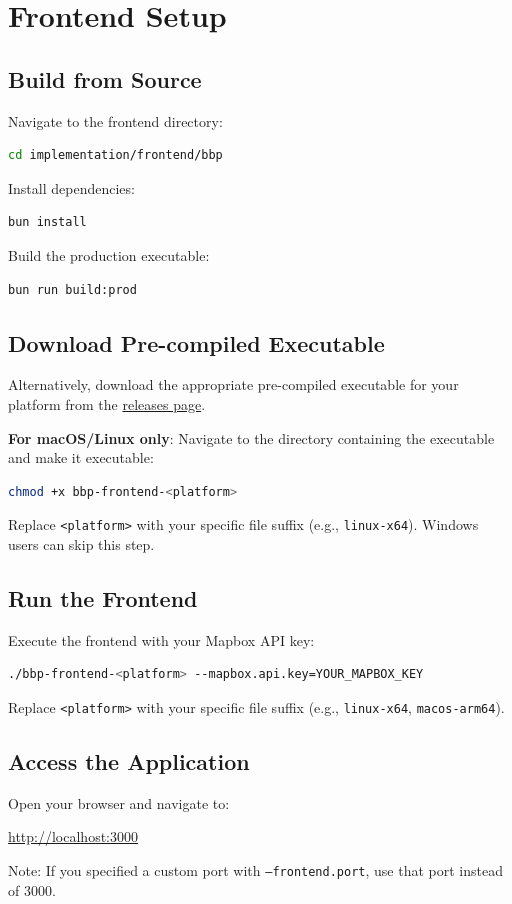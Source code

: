 \section{Frontend Setup}

\subsection{Build from Source}
Navigate to the frontend directory:
\begin{lstlisting}[language=bash]
cd implementation/frontend/bbp
\end{lstlisting}

\noindent Install dependencies:
\begin{lstlisting}[language=bash]
bun install
\end{lstlisting}

\noindent Build the production executable:
\begin{lstlisting}[language=bash]
bun run build:prod
\end{lstlisting}

\subsection{Download Pre-compiled Executable}
Alternatively, download the appropriate pre-compiled executable for your platform from the \href{https://github.com/m-tteo/sw-eng-2-raimondi-sala/releases/tag/BestBikePaths-v1.0.0}{releases page}.

\noindent \textbf{For macOS/Linux only}: Navigate to the directory containing the executable and make it executable:
\begin{lstlisting}[language=bash]
chmod +x bbp-frontend-<platform>
\end{lstlisting}
\noindent Replace \texttt{<platform>} with your specific file suffix (e.g., \texttt{linux-x64}). Windows users can skip this step.

\subsection{Run the Frontend}
Execute the frontend with your Mapbox API key:
\begin{lstlisting}[language=bash]
./bbp-frontend-<platform> --mapbox.api.key=YOUR_MAPBOX_KEY
\end{lstlisting}
\noindent Replace \texttt{<platform>} with your specific file suffix (e.g., \texttt{linux-x64}, \texttt{macos-arm64}).

\subsection{Access the Application}
Open your browser and navigate to:
\begin{center}
\url{http://localhost:3000}
\end{center}
\noindent Note: If you specified a custom port with \texttt{---frontend.port}, use that port instead of 3000.

